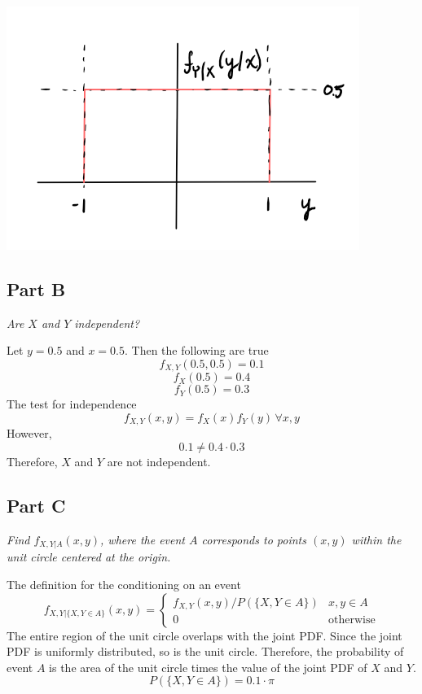 \documentclass{article}
\begin{document}
\begin{center}
    \includegraphics[scale=1]{Images/P1Avi.PNG}
\end{center}

\subsection*{Part B}

\textit{Are $X$ and $Y$ independent?}

\bigbreak

Let $y = 0.5$ and $x = 0.5$. Then the following are true
$$ f_{X,Y}(0.5, 0.5) = 0.1 $$
$$ f_X(0.5) = 0.4 $$
$$ f_Y(0.5) = 0.3 $$
The test for independence
$$ f_{X,Y}(x, y) = f_X(x) f_Y(y)\, \forall x, y $$
However,
$$ 0.1 \neq 0.4 \cdot 0.3 $$
Therefore, $X$ and $Y$ are not independent.

\subsection*{Part C}

\textit{Find $f_{X,Y|A}(x, y)$, where the event $A$ corresponds to points
$(x, y)$ within the unit circle centered at the origin.}

\bigbreak

The definition for the conditioning on an event
$$ f_{X,Y|\{X,Y \in A\}}(x, y) = \begin{cases}
    f_{X,Y}(x, y) / P(\{X, Y \in A\}) & x, y \in A \\
    0 & \mathrm{otherwise}
\end{cases} $$
The entire region of the unit circle overlaps with the joint PDF. Since the
joint PDF is uniformly distributed, so is the unit circle. Therefore, the
probability of event $A$ is the area of the unit circle times the value of
the joint PDF of $X$ and $Y$.
$$ P(\{X, Y \in A \}) = 0.1 \cdot \pi $$
\end{document}
